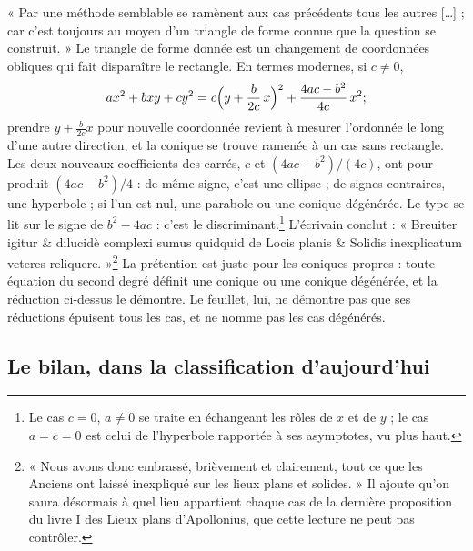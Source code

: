 \documentclass[11pt,a4paper]{article}
\begin{document}
« Par une méthode semblable se ramènent aux cas précédents tous les autres
[…] ; car c'est toujours au moyen d'un triangle de forme connue que la question
se construit. » Le triangle de forme donnée est un changement de coordonnées
obliques qui fait disparaître le rectangle. En termes modernes, si $c \neq 0$,
\[ ax^2 + bxy + cy^2
   = c\Bigl(y + \frac{b}{2c}\,x\Bigr)^2 + \frac{4ac - b^2}{4c}\,x^2 ; \]
prendre $y + \tfrac{b}{2c}x$ pour nouvelle coordonnée revient à mesurer
l'ordonnée le long d'une autre direction, et la conique se trouve ramenée à un
cas sans rectangle. Les deux nouveaux coefficients des carrés, $c$ et
$(4ac - b^2)/(4c)$, ont pour produit $(4ac - b^2)/4$ : de même signe, c'est une
ellipse ; de signes contraires, une hyperbole ; si l'un est nul, une parabole
ou une conique dégénérée. Le type se lit sur le signe de $b^2 - 4ac$ : c'est le
discriminant.\footnote{Le cas $c = 0$, $a \neq 0$ se
traite en échangeant les rôles de $x$ et de $y$ ; le cas $a = c = 0$ est celui
de l'hyperbole rapportée à ses asymptotes, vu plus haut.} L'écrivain conclut :
« Breuiter igitur \& dilucidè complexi sumus quidquid de Locis planis \&
Solidis inexplicatum veteres reliquere. »\footnote{« Nous avons donc embrassé,
brièvement et clairement, tout ce que les Anciens ont laissé inexpliqué sur les
lieux plans et solides. » Il ajoute qu'on saura désormais à quel lieu
appartient chaque cas de la dernière proposition du livre I des Lieux plans
d'Apollonius, que cette lecture ne peut pas contrôler.} La prétention est
juste pour les coniques propres : toute équation du second degré définit une
conique ou une conique dégénérée, et la réduction ci-dessus le démontre. Le
feuillet, lui, ne démontre pas que ses réductions épuisent tous les cas, et ne
nomme pas les cas dégénérés.

\subsection*{Le bilan, dans la classification d'aujourd'hui}
\end{document}
